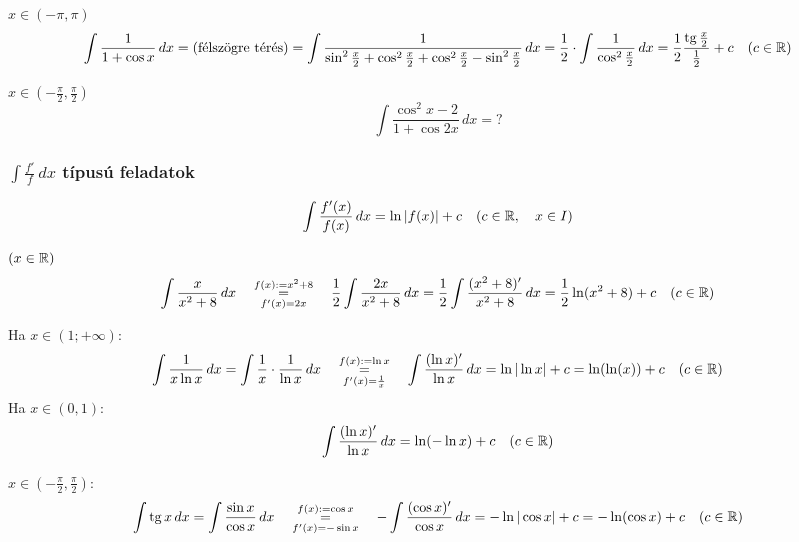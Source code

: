 \documentclass[a4paper,11.5pt]{article}
\DeclareMathOperator{\tg}{tg}
\begin{document}
	\begin{task} $x\in(-\pi,\pi)$
		\[\int\frac{1}{1+\cos x}\,dx=\text{(félszögre térés)}=\int\frac{1}{\sin^2\frac{x}{2}+\cos^2\frac{x}{2}+\cos^2\frac{x}{2}-\sin^2\frac{x}{2}}\,dx=\frac{1}{2}\cdot\int\frac{1}{\cos^2\frac{x}{2}}\,dx=\frac{1}{2}\frac{\tg \frac{x}{2}}{\frac{1}{2}}+c\quad (c\in\R) \]
	\end{task}
	\begin{exercise}$x\in\left(-\frac{\pi}{2},\frac{\pi}{2}\right)$
		\[ \int\frac{\cos^2x-2}{1+\cos2x}\,dx=? \]
	\end{exercise}
	\subsubsection{$\int\frac{f'}{f}\,dx$ típusú feladatok}
	\begin{task}
		\[ \int\frac{f'(x)}{f(x)}\,dx=\ln |f(x)|+c \quad (c\in\mathbb{R}, \quad x\in I)\]
	\end{task}
	\begin{task}$(x\in\mathbb{R})$
		\[ \int\frac{x}{x^2+8}\,dx\quad \overset{f(x):=x^2+8}{\underset{f'(x)=2x}{=}}\quad\frac{1}{2}\int\frac{2x}{x^2+8}\,dx=\frac{1}{2}\int\frac{(x^2+8)'}{x^2+8}\,dx=\frac{1}{2}\ln(x^2+8)+c\quad (c\in\mathbb{R})  \]
	\end{task}
	\begin{task}Ha $x\in(1;+\infty)$:
		\[ \int\frac{1}{x\ln x}\,dx= \int\frac{1}{x}\cdot\frac{1}{\ln x}\,dx\quad \overset{f(x):=\ln x}{\underset{f'(x)=\frac{1}{x}}{=}}\quad \int\frac{(\ln x)'}{\ln x}\,dx=\ln|\ln x|+c=\ln(\ln(x))+c\quad (c\in\mathbb{R}) \]
		Ha $x\in(0,1)$:
		\[ \int\frac{(\ln x)'}{\ln x}\,dx=\ln(-\ln x)+c\quad (c\in\mathbb{R}) \]
	\end{task}
	\begin{task}$x\in\left(-\frac{\pi}{2},\frac{\pi}{2}\right)$:
		\[ \int\tg x\,dx=\int\frac{\sin x}{\cos x}\,dx\quad \overset{f(x):=\cos x}{\underset{f'(x)=-\sin x}{=}}\quad -\int\frac{(\cos x)'}{\cos x}\,dx=-\ln|\cos x|+c=-\ln(\cos x)+c\quad (c\in\R) \]
	\end{task}
\end{document}
